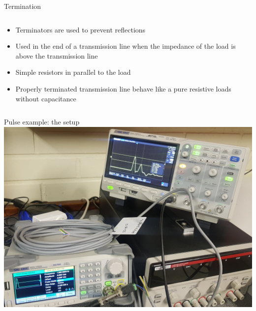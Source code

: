 \documentclass{beamer}
\begin{document}
\begin{frame}{Termination}
\begin{columns}
  \begin{column}{0.48\textwidth}
   \begin{itemize}
    \item Terminators are used to prevent reflections
    \item Used in the end of a transmission line when the impedance of
          the load is above the transmission line
    \item Simple resistors in parallel to the load
    \item Properly terminated transmission line behave like a pure resistive loads without capacitance
   \end{itemize}
  \end{column}
  \begin{column}{0.48\textwidth}
  \end{column}
\end{columns}
\end{frame}

\begin{frame}{Pulse example: the setup}
\centering\includegraphics[keepaspectratio, width=0.75\paperwidth]{pulse_setup.jpg}
\end{frame}
\end{document}
